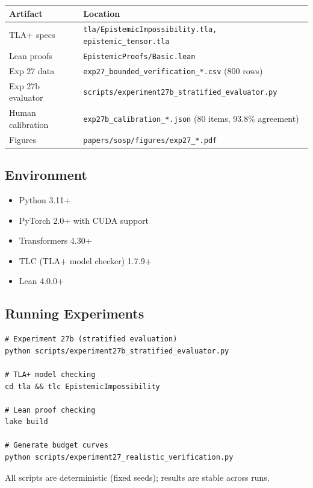 \documentclass[12pt]{article}
\begin{document}
\begin{table}[H]
\centering
\begin{tabular}{lp{8cm}}
\toprule
\textbf{Artifact} & \textbf{Location} \\
\midrule
TLA+ specs & \texttt{tla/EpistemicImpossibility.tla, epistemic\_tensor.tla} \\
Lean proofs & \texttt{EpistemicProofs/Basic.lean} \\
Exp 27 data & \texttt{exp27\_bounded\_verification\_*.csv} (800 rows) \\
Exp 27b evaluator & \texttt{scripts/experiment27b\_stratified\_evaluator.py} \\
Human calibration & \texttt{exp27b\_calibration\_*.json} (80 items, 93.8\% agreement) \\
Figures & \texttt{papers/sosp/figures/exp27\_*.pdf} \\
\bottomrule
\end{tabular}
\end{table}

\subsection{Environment}

\begin{itemize}
    \item Python 3.11+
    \item PyTorch 2.0+ with CUDA support
    \item Transformers 4.30+
    \item TLC (TLA+ model checker) 1.7.9+
    \item Lean 4.0.0+
\end{itemize}

\subsection{Running Experiments}

\begin{verbatim}
# Experiment 27b (stratified evaluation)
python scripts/experiment27b_stratified_evaluator.py

# TLA+ model checking
cd tla && tlc EpistemicImpossibility

# Lean proof checking
lake build

# Generate budget curves
python scripts/experiment27_realistic_verification.py
\end{verbatim}

All scripts are deterministic (fixed seeds); results are stable across runs.
\end{document}
